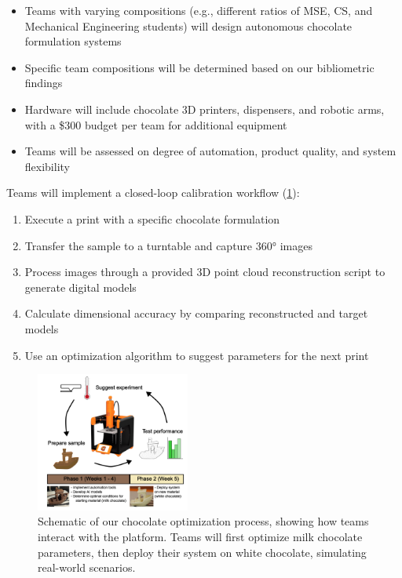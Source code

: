 \documentclass[11pt,letterpaper,twocolumn]{article}
\begin{document}
\begin{itemize}
    \item Teams with varying compositions (e.g., different ratios of MSE, CS, and Mechanical Engineering students) will design autonomous chocolate formulation systems
    \item Specific team compositions will be determined based on our bibliometric findings
    \item Hardware will include chocolate 3D printers, dispensers, and robotic arms, with a \$300 budget per team for additional equipment
    \item Teams will be assessed on degree of automation, product quality, and system flexibility
\end{itemize}

Teams will implement a closed-loop calibration workflow (\cref{fig:chocolate_schematic}):
\begin{enumerate}
    \item Execute a print with a specific chocolate formulation
    \item Transfer the sample to a turntable and capture 360° images
    \item Process images through a provided 3D point cloud reconstruction script to generate digital models \cite{ganitano_hybrid_2024}
    \item Calculate dimensional accuracy by comparing reconstructed and target models \cite{ganitano_hybrid_2024}
    \item Use an optimization algorithm to suggest parameters for the next print
\end{enumerate}

\begin{figure}[t]
    \centering
    \includegraphics[width=0.45\textwidth]{chocolate-optimization-schematic.png}
    \caption{\small Schematic of our chocolate optimization process, showing how teams interact with the platform. Teams will first optimize milk chocolate parameters, then deploy their system on white chocolate, simulating real-world scenarios.}
    \label{fig:chocolate_schematic}
\end{figure}
\end{document}
